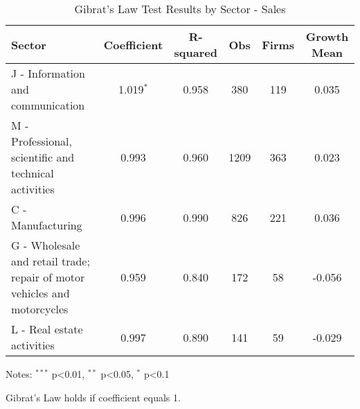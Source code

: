 \begin{table}[htbp]
\centering
\caption{Gibrat's Law Test Results by Sector - Sales}
\label{tab:gibrat_sector_sales}
\begin{tabular}{lccccc}
\hline\hline
Sector & Coefficient & R-squared & Obs & Firms & Growth Mean \\
\hline
J - Information and communication & 1.019$^{*}$ & 0.958 & 380 & 119 & 0.035 \\
M - Professional, scientific and technical activities & 0.993 & 0.960 & 1209 & 363 & 0.023 \\
C - Manufacturing & 0.996 & 0.990 & 826 & 221 & 0.036 \\
G - Wholesale and retail trade; repair of motor vehicles and motorcycles & 0.959 & 0.840 & 172 & 58 & -0.056 \\
L - Real estate activities & 0.997 & 0.890 & 141 & 59 & -0.029 \\
\hline\hline
\end{tabular}
\begin{tablenotes}
\small
\item Notes: $^{***}$ p<0.01, $^{**}$ p<0.05, $^{*}$ p<0.1
\item Gibrat's Law holds if coefficient equals 1.
\end{tablenotes}
\end{table}